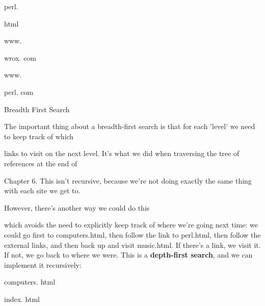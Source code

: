 \documentclass[a4paper,11pt]{book}
\begin{document}
\noindent 

\noindent 

\noindent perl.

\noindent html

\noindent 

\noindent 

\noindent 

\noindent 

\noindent www.

\noindent wrox. com

\noindent www.

\noindent perl. com

\noindent 

\noindent 

\noindent Breadth First Search

\noindent 

\noindent 

\noindent The important thing about a breadth-first search is that for each 'level' we need to keep track of which

\noindent links to visit on the next level. It's what we did when traversing the tree of references at the end of

\noindent Chapter 6. This isn't recursive, because we're not doing exactly the same thing with each site we get to.

\noindent 

\noindent However, there's another way we could do this

\noindent which avoids the need to explicitly keep track of where we're going next time: we could go first to computers.html, then follow the link to perl.html, then follow the external links, and then back up and visit music.html. If there's a link, we visit it. If not, we go back to where we were. This is a \textbf{depth-first search}, and we can implement it recursively:

\noindent 

\noindent 

\noindent 

\noindent 

\noindent 

\noindent 

\noindent 

\noindent 

\noindent computers. html

\noindent 

\noindent 

\noindent index. html
\end{document}
